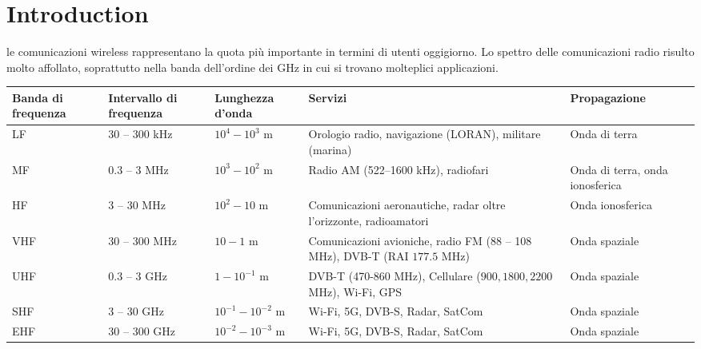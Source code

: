 \section*{Introduction}


le comunicazioni wireless rappresentano la quota più importante in termini di utenti oggigiorno. Lo spettro delle comunicazioni radio risulto molto affollato, soprattutto nella banda dell'ordine dei GHz in cui si trovano molteplici applicazioni.

\begin{table}[h!]
\centering
\begin{tabular}{ | m{2cm} | m{3cm} | m{2.5cm} | m{4cm} | m{2.5cm} | }
\hline
Banda di frequenza & Intervallo di frequenza & Lunghezza d'onda & Servizi & Propagazione \\
\hline
LF & 30 -- 300 kHz & \(10^{4} - 10^{3}\) m & Orologio radio, navigazione (LORAN), militare (marina) & Onda di terra \\
\hline
MF & 0.3 -- 3 MHz & \(10^{3} - 10^{2}\) m & Radio AM (522--1600 kHz), radiofari & Onda di terra, onda ionosferica \\
\hline
HF & 3 -- 30 MHz & \(10^{2} - 10\) m & Comunicazioni aeronautiche, radar oltre l'orizzonte, radioamatori & Onda ionosferica \\
\hline
VHF & 30 -- 300 MHz & \(10 - 1\) m & Comunicazioni avioniche, radio FM (88 -- 108 MHz), DVB-T (RAI \(177.5\) MHz) & Onda spaziale \\
\hline
UHF & 0.3 -- 3 GHz & \(1 - 10^{-1}\) m & DVB-T (470-860 MHz), Cellulare (\(900,1800,2200\) MHz), Wi-Fi, GPS & Onda spaziale \\
\hline
SHF & 3 -- 30 GHz & \(10^{-1} - 10^{-2}\) m & Wi-Fi, 5G, DVB-S, Radar, SatCom & Onda spaziale \\
\hline
EHF & 30 -- 300 GHz & \(10^{-2} - 10^{-3}\) m & Wi-Fi, 5G, DVB-S, Radar, SatCom & Onda spaziale \\
\hline
\end{tabular}
\end{table}

